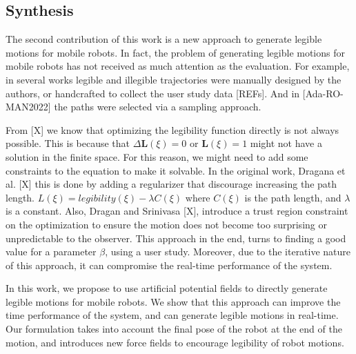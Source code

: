     \noindent
    \subsection{Synthesis} %
    The second contribution of this work is a new approach to generate legible motions for mobile robots.
    In fact, the problem of generating legible motions for mobile robots has not received as much attention as the evaluation.
    For example, in several works legible and illegible trajectories were manually designed by the authors,
    or handcrafted to collect the user study data [REFs].
    And in [Ada-RO-MAN2022] the paths were selected via a sampling approach.

    From [X] we know that optimizing the legibility function directly is not always possible.
    This is because that $\Delta \mathbf{L}(\xi) = 0$ or $\mathbf{L}(\xi) = 1$ might not have a solution in the finite space.
    For this reason, we might need to add some constraints to the equation to make it solvable.
    In the original work, Dragana et al. [X] this is done by adding a regularizer that discourage increasing the path length.
    $L(\xi) = legibility(\xi) - \lambda C(\xi)$
    where $C(\xi)$ is the path length, and $\lambda$ is a constant.
    Also, Dragan and Srinivasa [X], introduce a trust region constraint on the optimization
     to ensure the motion does not become too surprising or unpredictable to the observer.
    This approach in the end, turns to finding a good value for a parameter $\beta$, using a user study.
    Moreover, due to the iterative nature of this approach, it can compromise the real-time performance of the system.

    In this work, we propose to use artificial potential fields to directly generate legible motions for mobile robots.
    We show that this approach can improve the time performance of the system, and can generate legible motions in real-time.
    Our formulation takes into account the final pose of the robot at the end of the motion,
    and introduces new force fields to encourage legibility of robot motions.



%


